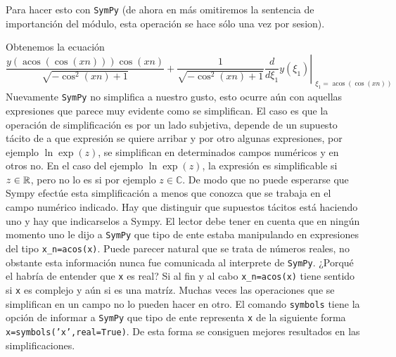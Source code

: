 Para hacer esto con \texttt{SymPy} (de ahora en más omitiremos la sentencia de importanción del módulo, esta operación se hace sólo una vez por sesion).

Obtenemos la ecuación
\[\frac{y{\left (\operatorname{acos}{\left (\cos{\left (xn \right )} \right )} \right )} \cos{\left (xn \right )}}{\sqrt{- \cos^{2}{\left (xn \right )} + 1}}
+ \frac{1}{\sqrt{- \cos^{2}{\left (xn \right )} + 1}} \left. \frac{d}{d \xi_{1
}} y{\left (\xi_{1} \right )} \right|_{\substack{ \xi_{1}=\operatorname{acos}{
\left (\cos{\left (xn \right )} \right )} }}\]
Nuevamente \texttt{SymPy} no simplifica a nuestro gusto, esto ocurre aún con aquellas expresiones que parece muy evidente como se simplifican. El caso es que la operación de simplificación es por un lado  subjetiva, depende de un supuesto tácito de a que expresión se quiere arribar y por otro algunas expresiones, por ejemplo $\ln\exp(z)$, se simplifican en determinados campos numéricos y en otros no. En el caso del ejemplo $\ln\exp(z)$, la expresión es simplificable si $z\in\mathbb{R}$, pero no lo es si por ejemplo $z\in\mathbb{C}$. De modo que no puede esperarse que Sympy efectúe esta simplificación a menos que conozca que se trabaja en el campo numérico indicado. Hay que distinguir que supuestos tácitos está haciendo uno y hay que indicarselos a Sympy.    El lector debe tener en cuenta que en ningún momento uno le dijo a \texttt{SymPy} que tipo de ente estaba manipulando en expresiones del tipo \texttt{x\_n=acos(x)}. Puede parecer natural que se trata de números reales, no obstante esta información nunca fue comunicada al interprete de \texttt{SymPy}. ¿Porqué el habría de entender que \texttt{x} es real? Si al fin y al cabo \texttt{x\_n=acos(x)} tiene sentido si \texttt{x} es complejo y aún si es una matríz. Muchas veces las operaciones que se simplifican en un campo no lo pueden hacer en otro. El comando  \texttt{symbols} tiene la opción de informar a \texttt{SymPy} que tipo de ente representa \texttt{x} de la siguiente forma
\texttt{x=symbols('x',real=True)}. De esta forma se consiguen mejores resultados en las simplificaciones.


